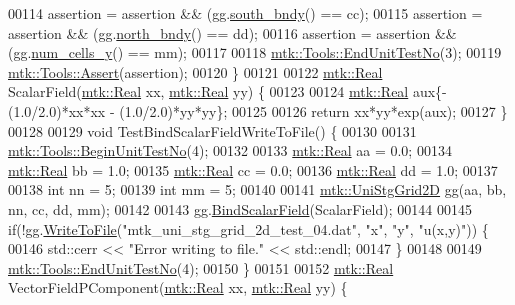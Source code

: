 \begin{DoxyCode}
00114   assertion = assertion && (gg.\hyperlink{classmtk_1_1UniStgGrid2D_a1442eaf219f099d0ebf46a170fdebf92}{south\_bndy}() == cc);
00115   assertion = assertion && (gg.\hyperlink{classmtk_1_1UniStgGrid2D_afe1ead253cdeb5503e0489eba8fd84e2}{north\_bndy}() == dd);
00116   assertion = assertion && (gg.\hyperlink{classmtk_1_1UniStgGrid2D_aed05a801cc9a76dba0ff203cea58a61a}{num\_cells\_y}() == mm);
00117 
00118   \hyperlink{classmtk_1_1Tools_ad8cf0085133dd40c913fe195bc5b9694}{mtk::Tools::EndUnitTestNo}(3);
00119   \hyperlink{classmtk_1_1Tools_aa311fada9255627d06c56b1e4fedce9e}{mtk::Tools::Assert}(assertion);
00120 \}
00121 
00122 \hyperlink{group__c01-roots_gac080bbbf5cbb5502c9f00405f894857d}{mtk::Real} ScalarField(\hyperlink{group__c01-roots_gac080bbbf5cbb5502c9f00405f894857d}{mtk::Real} xx, \hyperlink{group__c01-roots_gac080bbbf5cbb5502c9f00405f894857d}{mtk::Real} yy) \{
00123 
00124   \hyperlink{group__c01-roots_gac080bbbf5cbb5502c9f00405f894857d}{mtk::Real} aux\{-(1.0/2.0)*xx*xx - (1.0/2.0)*yy*yy\};
00125 
00126   \textcolor{keywordflow}{return} xx*yy*exp(aux);
00127 \}
00128 
00129 \textcolor{keywordtype}{void} TestBindScalarFieldWriteToFile() \{
00130 
00131   \hyperlink{classmtk_1_1Tools_a26ee906d28523378522a75e25c3a4e19}{mtk::Tools::BeginUnitTestNo}(4);
00132 
00133   \hyperlink{group__c01-roots_gac080bbbf5cbb5502c9f00405f894857d}{mtk::Real} aa = 0.0;
00134   \hyperlink{group__c01-roots_gac080bbbf5cbb5502c9f00405f894857d}{mtk::Real} bb = 1.0;
00135   \hyperlink{group__c01-roots_gac080bbbf5cbb5502c9f00405f894857d}{mtk::Real} cc = 0.0;
00136   \hyperlink{group__c01-roots_gac080bbbf5cbb5502c9f00405f894857d}{mtk::Real} dd = 1.0;
00137 
00138   \textcolor{keywordtype}{int} nn = 5;
00139   \textcolor{keywordtype}{int} mm = 5;
00140 
00141   \hyperlink{classmtk_1_1UniStgGrid2D}{mtk::UniStgGrid2D} gg(aa, bb, nn, cc, dd, mm);
00142 
00143   gg.\hyperlink{classmtk_1_1UniStgGrid2D_ab6aff36e9f89fba1c1ff4f9914508211}{BindScalarField}(ScalarField);
00144 
00145   \textcolor{keywordflow}{if}(!gg.\hyperlink{classmtk_1_1UniStgGrid2D_a1787a79e4bcee6b89c681dc7e5e2d7bc}{WriteToFile}(\textcolor{stringliteral}{"mtk\_uni\_stg\_grid\_2d\_test\_04.dat"}, \textcolor{stringliteral}{"x"}, \textcolor{stringliteral}{"y"}, \textcolor{stringliteral}{"u(x,y)"})) \{
00146     std::cerr << \textcolor{stringliteral}{"Error writing to file."} << std::endl;
00147   \}
00148 
00149   \hyperlink{classmtk_1_1Tools_ad8cf0085133dd40c913fe195bc5b9694}{mtk::Tools::EndUnitTestNo}(4);
00150 \}
00151 
00152 \hyperlink{group__c01-roots_gac080bbbf5cbb5502c9f00405f894857d}{mtk::Real} VectorFieldPComponent(\hyperlink{group__c01-roots_gac080bbbf5cbb5502c9f00405f894857d}{mtk::Real} xx, \hyperlink{group__c01-roots_gac080bbbf5cbb5502c9f00405f894857d}{mtk::Real} yy) \{

\end{DoxyCode}
